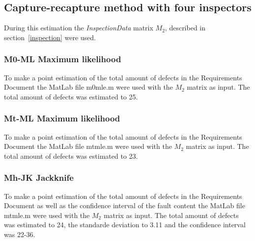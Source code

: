 \subsection{Capture-recapture method with four inspectors}
During this estimation the \textit{InspectionData} matrix $M_{2}$, described in section~\ref{inspection} were used.
\subsubsection{M0-ML Maximum likelihood}
To make a point estimation of the total amount of defects in the Requirements Document the MatLab file m0mle.m were used with the $M_{2}$ matrix as input. The total amount of defects was estimated to 25.
\subsubsection{Mt-ML Maximum likelihood}
To make a point estimation of the total amount of defects in the Requirements Document the MatLab file mtmle.m were used with the $M_{2}$ matrix as input. The total amount of defects was estimated to 23.
\subsubsection{Mh-JK Jackknife}
To make a point estimation of the total amount of defects in the Requirements Document as well as the confidence interval of the fault content the MatLab file mtmle.m were used with the $M_{2}$ matrix as input. The total amount of defects was estimated to 24, the standarde deviation to 3.11 and the confidence interval was 22-36.